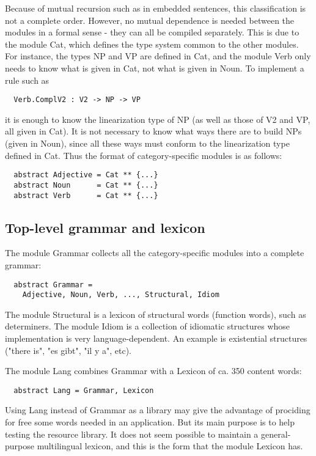 \documentclass[11pt,a4paper]{article}
\begin{document}
Because of mutual recursion such as in embedded sentences, this classification is
not a complete order. However, no mutual dependence is needed between the 
modules in a formal sense - they can all be compiled separately. This is due
to the module Cat, which defines the type system common to the other modules.
For instance, the types NP and VP are defined in Cat, and the module Verb only
needs to know what is given in Cat, not what is given in Noun. To implement
a rule such as

\begin{verbatim}
  Verb.ComplV2 : V2 -> NP -> VP
\end{verbatim}
it is enough to know the linearization type of NP (as well as those of V2 and VP, all
given in Cat). It is not necessary to know what
ways there are to build NPs (given in Noun), since all these ways must 
conform to the linearization type defined in Cat. Thus the format of
category-specific modules is as follows:

\begin{verbatim}
  abstract Adjective = Cat ** {...}
  abstract Noun      = Cat ** {...}
  abstract Verb      = Cat ** {...}
\end{verbatim}

\subsection{Top-level grammar and lexicon}
The module Grammar collects all the category-specific modules into
a complete grammar:

\begin{verbatim}
  abstract Grammar = 
    Adjective, Noun, Verb, ..., Structural, Idiom
\end{verbatim}
The module Structural is a lexicon of structural words (function words),
such as determiners.
The module Idiom is a collection of idiomatic structures whose
implementation is very language-dependent. An example is existential
structures ("there is", "es gibt", "il y a", etc).

The module Lang combines Grammar with a Lexicon of ca. 350 content words:

\begin{verbatim}
  abstract Lang = Grammar, Lexicon
\end{verbatim}
Using Lang instead of Grammar as a library may give the advantage of prociding
for free some words needed in an application. But its main purpose is to
help testing the resource library. It does not seem possible to maintain
a general-purpose multilingual lexicon, and this is the form that the module
Lexicon has.
\end{document}

